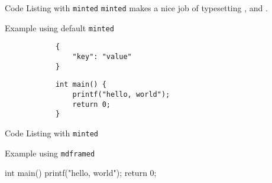 

\begin{frame}[fragile]{Code Listing with \texttt{minted}}
    \noindent\texttt{minted} makes a nice job of typesetting , and .

    \begin{listing}
        \caption{Example using default \texttt{minted}}
        \begin{verbatim}
            {
                "key": "value"
            }
        \end{verbatim}
        \begin{verbatim}
            int main() {
                printf("hello, world");
                return 0;
            }
        \end{verbatim}
        \label{listing:1}
    \end{listing}
\end{frame}

\begin{frame}[fragile]{Code Listing with \texttt{minted}}


    \begin{listing}
        \caption{Example using \texttt{mdframed}}
        \begin{Ccode}
int main() {
    printf("hello, world");
    return 0;
}
        \end{Ccode}
        \label{listing:2}
    \end{listing}
\end{frame}

